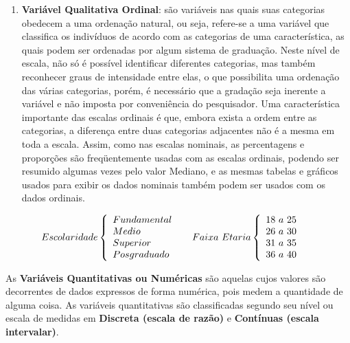 \begin{enumerate}
\newpage
\item \textbf{Variável Qualitativa Ordinal}: são variáveis nas quais suas categorias obedecem a uma ordenação natural, ou seja, refere-se a uma variável que classifica os indivíduos de acordo com as categorias de uma característica, as quais podem ser ordenadas por algum sistema de graduação. Neste nível de escala, não só é possível identificar diferentes categorias, mas também reconhecer graus de intensidade entre elas, o que possibilita uma ordenação das várias categorias, porém, é necessário que a gradação seja inerente a variável e não imposta por conveniência do pesquisador. Uma característica importante das escalas ordinais é que, embora exista a ordem entre as categorias, a diferença entre duas categorias adjacentes não é a mesma em toda a escala. Assim, como nas escalas nominais, as percentagens e proporções são freqüentemente usadas com as escalas ordinais, podendo ser resumido algumas vezes pelo valor Mediano, e as mesmas tabelas e gráficos usados para exibir os dados nominais também podem ser usados com os dados ordinais.
\end{enumerate}


$$
    Escolaridade
    \left\{
    \begin{array}{ll}
    Fundamental  & \hbox{ } \\
    Medio        & \hbox{ } \\
    Superior     & \hbox{ } \\
    Posgraduado  & \hbox{ }
    \end{array}
    \right.
    Faixa \ Etaria
    \left\{
    \begin{array}{ll}
    18 \ a \ 25   & \hbox{ } \\
    26 \ a \ 30   & \hbox{ } \\
    31 \ a \ 35   & \hbox{ } \\
    36 \ a \ 40    & \hbox{ }
    \end{array}
    \right.
    $$



As \textbf{Variáveis Quantitativas ou Numéricas} são aquelas cujos valores são de\-cor\-ren\-tes de dados expressos de forma numérica, pois medem a quantidade de alguma coisa. As variáveis quantitativas são classificadas segundo seu nível ou escala de medidas em \textbf{Discreta (escala de razão)} e \textbf{Contínuas (escala intervalar)}.



